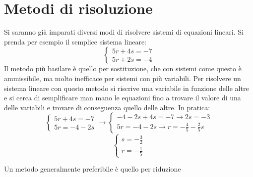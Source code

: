 \section{Metodi di risoluzione}
Si saranno già imparati diversi modi di risolvere sistemi di equazioni lineari. Si prenda per esempio il semplice sistema lineare:
\[
    \begin{cases}
        5r + 4s = -7 \\
        5r + 2s = -4
    \end{cases}
\]
Il metodo più basilare è quello per sostituzione, che con sistemi come questo è ammissibile, ma molto inefficace per sistemi con più variabili. Per risolvere un sistema lineare con questo metodo si riscrive una variabile in funzione delle altre e si cerca di semplificare man mano le equazioni fino a trovare il valore di una delle variabili e trovare di conseguenza quello delle altre. In pratica:
\[
    \begin{cases}
        5r + 4s = -7 \\
        5r = -4 - 2s
    \end{cases}
    \rightarrow
    \begin{cases}
        -4 - 2s + 4s = -7 \rightarrow 2s = -3\\
        5r = -4 - 2s \rightarrow r = -\frac{4}{5} - \frac{2}{5}s
    \end{cases}
\]
\[
    \begin{cases}
        s = -\frac{3}{2} \\
        r = -\frac{1}{5}
    \end{cases}
\]

Un metodo generalmente preferibile è quello per riduzione